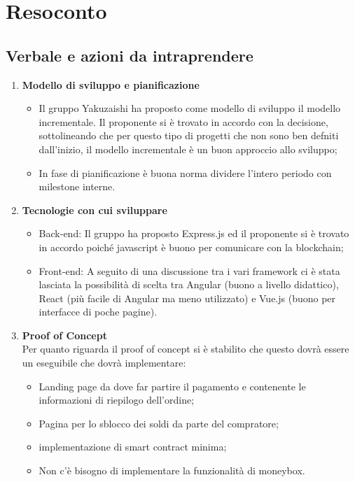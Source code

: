 \section{Resoconto}
\subsection{Verbale e azioni da intraprendere}

\begin{enumerate}
	\item \textbf{Modello di sviluppo e pianificazione}
	\begin{itemize}
		\item Il gruppo Yakuzaishi ha proposto come modello di sviluppo il modello incrementale. Il proponente si è trovato in accordo con la decisione, sottolineando che per questo tipo di progetti che non sono ben defniti dall'inizio, il modello incrementale è un buon approccio allo sviluppo;
		\item In fase di pianificazione è buona norma dividere l'intero periodo con milestone\glo{} interne.
	\end{itemize}
	\item \textbf{Tecnologie con cui sviluppare}
	\begin{itemize}
		\item Back-end: Il gruppo ha proposto Express.js ed il proponente si è trovato in accordo poiché javascript\glo{} è buono per comunicare con la blockchain;
		\item Front-end: A seguito di una discussione tra i vari framework ci è stata lasciata la possibilità di scelta tra Angular\glo{} (buono a livello didattico), React\glo{} (più facile di Angular\glo{} ma meno utilizzato) e Vue.js (buono per interfacce di poche pagine).
	\end{itemize}
	\item \textbf{Proof of Concept}\\
		Per quanto riguarda il proof of concept si è stabilito che questo dovrà essere un eseguibile che dovrà implementare:
	\begin{itemize}
		\item Landing page da dove far partire il pagamento e contenente le informazioni di riepilogo dell'ordine;
		\item Pagina per lo sblocco dei soldi da parte del compratore;
		\item implementazione di smart contract\glo{} minima;
		\item Non c'è bisogno di implementare la funzionalità di moneybox\glo{}.

\end{itemize}
\end{enumerate}
